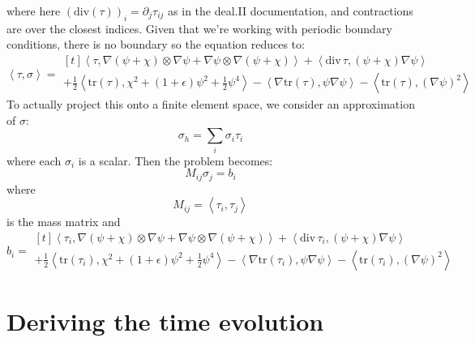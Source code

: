 \documentclass[reqno]{article}
\begin{document}
where here $(\text{div}(\tau))_{i} = \partial_j \tau_{ij}$ as in the deal.II documentation, and contractions are over the closest indices.
Given that we're working with periodic boundary conditions, there is no boundary so the equation reduces to:
\begin{equation}
    \left< \tau, \sigma \right>
    =
    \begin{multlined}[t]
        \left< \tau, \nabla \left( \psi + \chi \right)\otimes \nabla \psi 
            + \nabla \psi \otimes \nabla (\psi + \chi) \right>
        + \left<\text{div} \, \tau, (\psi + \chi) \nabla \psi \right> \\
        + \tfrac12 \left< \text{tr}(\tau), \chi^2 + (1 + \epsilon) \psi^2 + \tfrac12 \psi^4\right>
        - \left< \nabla \text{tr}(\tau), \psi \nabla \psi \right>
        - \left< \text{tr}(\tau), \left(\nabla \psi\right)^2 \right>
    \end{multlined}
\end{equation}
To actually project this onto a finite element space, we consider an approximation of $\sigma$:
\begin{equation}
    \sigma_h = \sum_i \sigma_i \tau_i
\end{equation}
where each $\sigma_i$ is a scalar.
Then the problem becomes:
\begin{equation}
    M_{ij} \sigma_j = b_i
\end{equation}
where
\begin{equation}
    M_{ij}
    =
    \left<\tau_i, \tau_j\right>
\end{equation}
is the mass matrix and
\begin{equation}
    b_i
    =
    \begin{multlined}[t]
        \left< \tau_i, \nabla \left( \psi + \chi \right)\otimes \nabla \psi 
            + \nabla \psi \otimes \nabla (\psi + \chi) \right>
        + \left<\text{div} \, \tau_i, (\psi + \chi) \nabla \psi \right> \\
        + \tfrac12 \left< \text{tr}(\tau_i), \chi^2 + (1 + \epsilon) \psi^2 + \tfrac12 \psi^4\right>
        - \left< \nabla \text{tr}(\tau_i), \psi \nabla \psi \right>
        - \left< \text{tr}(\tau_i), \left(\nabla \psi\right)^2 \right>
    \end{multlined}
\end{equation}

\section{Deriving the time evolution}
\end{document}
